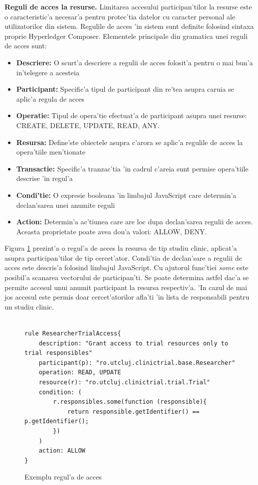 \documentclass[12pt,a4paper,twoside]{report}
\begin{document}
\textbf{Reguli de acces la resurse.} Limitarea accesului participan'tilor la resurse este o caracteristic'a necesar'a pentru protec'tia datelor cu caracter personal ale utilizatorilor din sistem. Regulile de acces 'in sistem sunt definite folosind sintaxa proprie Hyperledger Composer. Elementele principale din gramatica unei reguli de acces sunt: 
\begin{itemize}
    \item \textbf{Descriere:} O scurt'a descriere a regulii de acces folosit'a pentru o mai bun'a in'telegere a acesteia
    \item \textbf{Participant:} Specific'a tipul de participant din re'tea asupra caruia se aplic'a regula de acces 
    \item \textbf{Operatie:} Tipul de opera'tie efectuat'a de participant asupra unei resurse: CREATE, DELETE, UPDATE, READ, ANY.
    \item \textbf{Resursa:} Define'ste obiectele asupra c'arora se aplic'a regulile de acces la opera'tiile men'tionate
    \item \textbf{Transactie:} Specific'a tranzac'tia 'in cadrul c'areia sunt permise opera'tiile descrise 'in regul'a
    \item \textbf{Condi'tie:} O expresie booleana 'in limbajul JavaScript care determin'a declan'sarea unei anumite reguli
    \item \textbf{Action:} Determin'a ac'tiunea care are loc dupa declan'sarea regulii de acces. Aceasta proprietate poate avea dou'a valori: ALLOW, DENY.
\end{itemize}

Figura \ref{fig:acl} prezint'a o regul'a de acces la resursa de tip studiu clinic, aplicat'a asupra participan'tilor de tip cercet'ator. Condi'tia de declan'sare a regulii de acces este descris'a folosind limbajul JavaScript. Cu ajutorul func'tiei \emph{some} este posibil'a scanarea vectorului de participan'ti. Se poate determina astfel dac'a se permite accesul unui anumit participant la resursa respectiv'a. 'In cazul de mai jos accesul este permis doar cercet'atorilor afla'ti 'in lista de responsabili pentru un studiu clinic.

    	\begin{figure}[H]
		\begin{center}
			\begin{lstlisting}[style=htmlcssjs]

rule ResearcherTrialAccess{
    description: "Grant access to trial resources only to trial responsibles"
    participant(p): "ro.utcluj.clinictrial.base.Researcher"
    operation: READ, UPDATE
    resource(r): "ro.utcluj.clinictrial.trial.Trial"
    condition: (
        r.responsibles.some(function (responsible){
            return responsible.getIdentifier() == p.getIdentifier();
        })
    )
    action: ALLOW
}
						\end{lstlisting}
			\caption{Exemplu regul'a de acces}
  			\label{fig:acl}
  		\end{center}
  		\end{figure}
\end{document}
